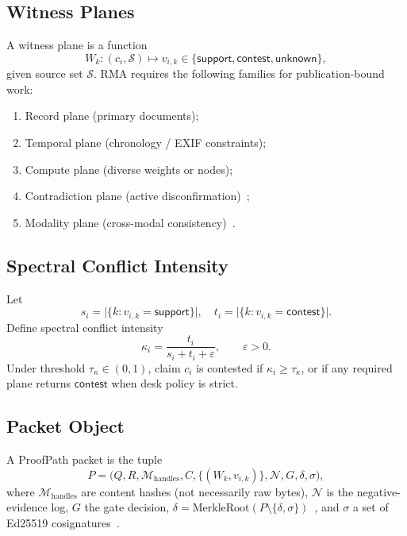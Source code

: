 \documentclass[journal,10pt,twocolumn,a4paper]{IEEEtran}
\begin{document}
\subsection{Witness Planes}
A witness plane is a function
\begin{equation}
W_k:(c_i,\mathcal{S})\mapsto v_{i,k}\in\{\mathsf{support},\mathsf{contest},\mathsf{unknown}\},
\end{equation}
given source set $\mathcal{S}$.
RMA requires the following families for publication-bound work:
\begin{enumerate}
  \item Record plane (primary documents);
  \item Temporal plane (chronology / EXIF constraints);
  \item Compute plane (diverse weights or nodes);
  \item Contradiction plane (active disconfirmation)~\cite{schuster2021get};
  \item Modality plane (cross-modal consistency)~\cite{radford2021clip}.
\end{enumerate}

\subsection{Spectral Conflict Intensity}
Let
\begin{equation}
s_i=\lvert\{k:v_{i,k}=\mathsf{support}\}\rvert,\quad
t_i=\lvert\{k:v_{i,k}=\mathsf{contest}\}\rvert.
\end{equation}
Define spectral conflict intensity
\begin{equation}
\label{eq:kappa}
\kappa_i=\frac{t_i}{s_i+t_i+\varepsilon},\qquad \varepsilon>0.
\end{equation}
Under threshold $\tau_\kappa\in(0,1)$, claim $c_i$ is contested if $\kappa_i\ge\tau_\kappa$, or if any required plane returns $\mathsf{contest}$ when desk policy is strict.

\subsection{Packet Object}
A ProofPath packet is the tuple
\begin{equation}
\label{eq:packet}
P=\big(Q,R,\mathcal{M}_{\mathrm{handles}},C,\{(W_k,v_{i,k})\},\mathcal{N},G,\delta,\sigma\big),
\end{equation}
where $\mathcal{M}_{\mathrm{handles}}$ are content hashes (not necessarily raw bytes), $\mathcal{N}$ is the negative-evidence log, $G$ the gate decision, $\delta=\mathrm{MerkleRoot}(P\setminus\{\delta,\sigma\})$~\cite{merkle1987digital}, and $\sigma$ a set of Ed25519 cosignatures~\cite{edwards25519}.
\end{document}
